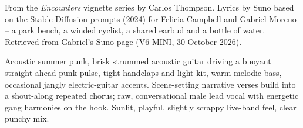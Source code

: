 
\label{sec:enough-sun-to-share}
\begin{notes}
From the \emph{Encounters} vignette series by Carlos Thompson. Lyrics by Suno based on the Stable Diffusion prompts (2024) for Felicia Campbell and Gabriel Moreno -- a park bench, a winded cyclist, a shared earbud and a bottle of water. Retrieved from Gabriel's Suno page (V6-MINI, 30 October 2026).
\end{notes}
\begin{style}
Acoustic summer punk, brisk strummed acoustic guitar driving a buoyant straight-ahead punk pulse, tight handclaps and light kit, warm melodic bass, occasional jangly electric-guitar accents. Scene-setting narrative verses build into a shout-along repeated chorus; raw, conversational male lead vocal with energetic gang harmonies on the hook. Sunlit, playful, slightly scrappy live-band feel, clear punchy mix.
\end{style}
